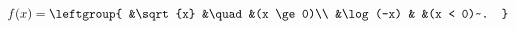 
\begin{issues}
\issueDraft
\end{issues}

\begin{equation}
f(x) = \leftgroup{
    &\sqrt{x} &\quad &(x \ge 0)\\
    &\log(-x) & &(x < 0)~.
}
\end{equation}


\begin{equation}

\end{equation}